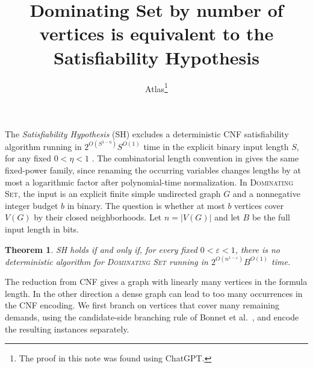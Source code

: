 \documentclass[11pt]{article}
\title{Dominating Set by number of vertices is equivalent to the Satisfiability Hypothesis}
\author{Atlas\thanks{The proof in this note was found using ChatGPT.}}
\date{}
\newtheorem{theorem}{Theorem}
\begin{document}
\maketitle

The \emph{Satisfiability Hypothesis} (SH) excludes a deterministic CNF satisfiability algorithm running in $2^{O(S^{1-\eta})}S^{O(1)}$ time in the explicit binary input length $S$, for any fixed $0<\eta<1$ \cite{sh}. The combinatorial length convention in \cite{sh} gives the same fixed-power family, since renaming the occurring variables changes lengths by at most a logarithmic factor after polynomial-time normalization. In \textsc{Dominating Set}, the input is an explicit finite simple undirected graph $G$ and a nonnegative integer budget $b$ in binary. The question is whether at most $b$ vertices cover $V(G)$ by their closed neighborhoods. Let $n=|V(G)|$ and let $B$ be the full input length in bits.

\hypertarget{dominating-set-order-sh}{}
\begin{theorem}\label{thm:ds-order-sh}
SH holds if and only if, for every fixed $0<\varepsilon<1$, there is no deterministic algorithm for \textup{\textsc{Dominating Set}} running in $2^{O(n^{1-\varepsilon})}B^{O(1)}$ time.
\end{theorem}

The reduction from CNF gives a graph with linearly many vertices in the formula length. In the other direction a dense graph can lead to too many occurrences in the CNF encoding. We first branch on vertices that cover many remaining demands, using the candidate-side branching rule of Bonnet et al.~\cite[Proposition~5, proof item~2]{bekp}, and encode the resulting instances separately.
\end{document}
